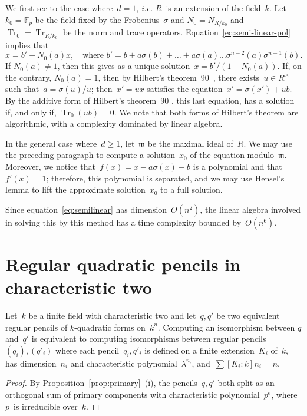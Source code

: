 \documentclass{lms}
\let\fr\mathfrak
\DeclareMathOperator\Tr{Tr}
\def\F{\mathbb{F}}
\begin{document}
We first see to the case where~$d = 1$, \emph{i.e.} $R$~is an extension
of the field~$k$. Let~$k_0 = \F_p$ be the field fixed by the
Frobenius~$σ$ and $N_0 = N_{R/k_0}$ and~$\Tr_0 = \Tr_{R/k_0}$ be the
norm and trace operators. Equation~\eqref{eq:semi-linear-pol} implies
that
\begin{equation}
x = b' + N_0(a) x, \quad\text{where $b' = b + a σ(b) + … + a σ(a) …
σ^{n-2}(a) σ^{n-1}(b)$.}
\end{equation}
If $N_0(a) ≠ 1$, then this gives as a unique solution~$x =
b'/(1-N_0(a))$. If, on the contrary, $N_0(a) = 1$, then by
Hilbert's theorem~90~\cite[VI.6.1]{lang-algebra3},
there exists~$u ∈ R^{×}$ such that~$a = σ(u)/u$;
then~$x' = ux$ satisfies the equation~$x' = σ(x') + ub$.
By the additive form of Hilbert's theorem~90 \cite[VI.6.3]{lang-algebra3},
this last equation, has a solution if, and only if, $\Tr_0 (ub) = 0$.
We note that both forms of Hilbert's theorem are algorithmic,
with a complexity dominated by linear algebra.

In the general case where~$d ≥ 1$, let~$\fr m$ be the maximal ideal
of~$R$. We may use the preceding paragraph to compute a solution~$x_0$ of
the equation modulo~$\fr m$. Moreover, we notice that~$f(x) = x -  a σ(x)
- b$ is a polynomial and that~$f'(x) = 1$; therefore, this polynomial is
separated, and we may use Hensel's lemma to lift the approximate
solution~$x_0$ to a full solution.

\medskip
Since equation~\eqref{eq:semilinear} has dimension~$O(n^2)$,
the linear algebra involved in solving this by this method
has a time complexity bounded by~$O(n^6)$.

\section{Regular quadratic pencils in characteristic two}
\label{S:quad-reg}



\begin{prop}
Let~$k$ be a finite field with characteristic two
and let~$q, q'$ be two equivalent
regular pencils of $k$-quadratic forms on~$k^n$.
Computing an isomorphism between $q$ and~$q'$
is equivalent to computing isomorphisms
between regular pencils~$(q_i), (q'_i)$
where each pencil~$q_i, q'_i$ is defined on a finite extension~$K_i$ of~$k$,
has dimension~$n_i$ and characteristic polynomial~$λ^{n_i}$,
and~$∑ [K_i:k] n_i = n$.
\end{prop}


\begin{proof}
By Proposition~\ref{prop:primary}~(i),
the pencils~$q, q'$ both split as an orthogonal sum
of primary components with characteristic polynomial~$p^e$,
where $p$~is irreducible over~$k$.
\end{proof}
\end{document}
